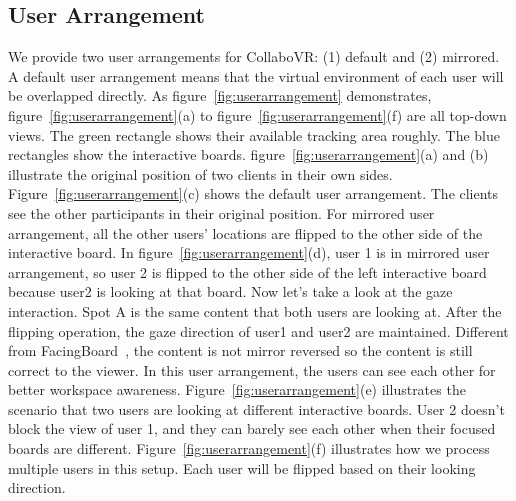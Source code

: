 \documentclass{sigchi}
\begin{document}
\subsection{User Arrangement}
We provide two user arrangements for CollaboVR: (1) default and (2) mirrored. A default user arrangement means that the virtual environment of each user will be overlapped directly. As figure~\ref{fig:userarrangement} demonstrates, figure~\ref{fig:userarrangement}(a) to figure~\ref{fig:userarrangement}(f) are all top-down views. The green rectangle shows their available tracking area roughly. The blue rectangles show the interactive boards. figure~\ref{fig:userarrangement}(a) and (b) illustrate the original position of two clients in their own sides. Figure~\ref{fig:userarrangement}(c) shows the default user arrangement. The clients see the other participants in their original position. For mirrored user arrangement, all the other users' locations are flipped to the other side of the interactive board. In figure~\ref{fig:userarrangement}(d), user 1 is in mirrored user arrangement, so user 2 is flipped to the other side of the left interactive board because user2 is looking at that board. Now let's take a look at the gaze interaction. Spot A is the same content that both users are looking at. After the flipping operation, the gaze direction of user1 and user2 are maintained. Different from FacingBoard~\cite{li2014interactive}, the content is not mirror reversed so the content is still correct to the viewer. In this user arrangement, the users can see each other for better workspace awareness. Figure~\ref{fig:userarrangement}(e) illustrates the scenario that two users are looking at different interactive boards. User 2 doesn't block the view of user 1, and they can barely see each other when their focused boards are different. Figure~\ref{fig:userarrangement}(f) illustrates how we process multiple users in this setup. Each user will be flipped based on their looking direction.
\end{document}
